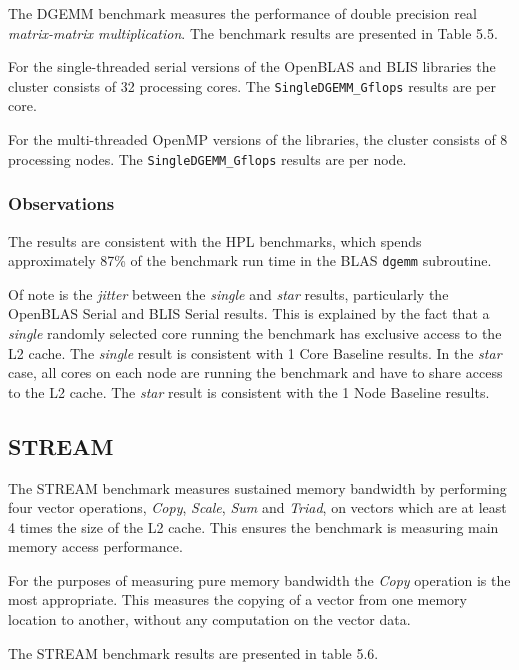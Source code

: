 The DGEMM benchmark measures the performance of double precision real \emph{matrix-matrix multiplication}. The benchmark results are presented in Table 5.5.

For the single-threaded serial versions of the OpenBLAS and BLIS libraries the cluster consists of 32 processing cores. The \verb|SingleDGEMM_Gflops| results are per core.

For the multi-threaded OpenMP versions of the libraries, the cluster consists of 8 processing nodes. The \verb|SingleDGEMM_Gflops| results are per node.

\subsubsection{Observations}

The results are consistent with the HPL benchmarks, which spends approximately 87\% of the benchmark run time in the BLAS \verb|dgemm| subroutine. 

Of note  is the \emph{jitter} between the \emph{single} and \emph{star} results, particularly the OpenBLAS Serial and BLIS Serial results. This is explained by the fact that a \emph{single} randomly selected core running the benchmark has exclusive access to the L2 cache. The \emph{single} result is consistent with 1 Core Baseline results. In the \emph{star} case, all cores on each node are running the benchmark and have to share access to the L2 cache. The \emph{star} result is consistent with the 1 Node Baseline results.


%
%
\subsection{STREAM}

The STREAM benchmark measures sustained memory bandwidth by performing four vector operations, \emph{Copy}, \emph{Scale}, \emph{Sum} and \emph{Triad}, on vectors which are at least 4 times the size of the L2 cache. This ensures the benchmark is measuring main memory access performance.

For the purposes of measuring pure memory bandwidth the \emph{Copy} operation is the most appropriate. This measures the copying of a vector from one memory location to another, without any computation on the vector data.   

The STREAM benchmark results are presented in table 5.6.

